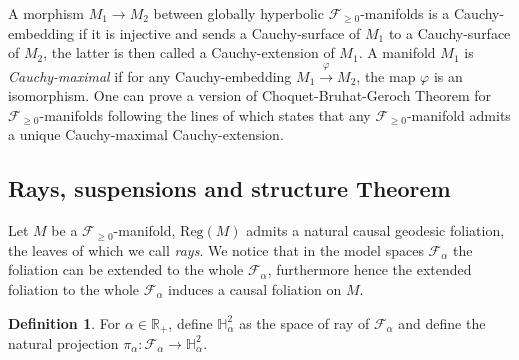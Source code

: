 \documentclass[a4paper,12pt]{article}
\def\H{\mathbb{H}}
\def\RR{\mathbb{R}}
\def\Reg{\mathrm{Reg}}
\def\reg{\Reg}
\def\Future{\mathcal F}
\def\reg{\mathrm{Reg}}
\def\Reg{\mathrm{Reg}}
\theoremstyle{definition}
\newtheorem{defi}[lem]{Definition}	%
\begin{document}
			A morphism $M_1\rightarrow M_2$ between globally hyperbolic $\Future_{\geq0}$-manifolds is a Cauchy-embedding if it is injective and sends a Cauchy-surface of $M_1$ to a Cauchy-surface of $M_2$, the latter is then called a Cauchy-extension of $M_1$. A manifold $M_1$ is {\it Cauchy-maximal} if for any Cauchy-embedding $M_1\xrightarrow{\varphi}M_2$, the map $\varphi$ is an isomorphism. One can prove \cite{thesis,brunswic2021Cauchy} a version of Choquet-Bruhat-Geroch Theorem for $\Future_{\geq0}$-manifolds following the lines of \cite{sbierski_geroch} which states that any $\Future_{\geq0}$-manifold admits a unique Cauchy-maximal Cauchy-extension.     
		\subsection{Rays, suspensions and structure Theorem}
		
		Let $M$ be a $\Future_{\geq0}$-manifold, $\reg(M)$ admits a natural causal geodesic foliation, the leaves of which we call {\it rays}. We notice that in the model spaces $\Future_\alpha$ the foliation can be extended to the whole $\Future_\alpha$, furthermore hence the extended foliation to the whole $\Future_\alpha$ induces a causal foliation on $M$.
		
		
		
		
		\begin{defi} For $\alpha\in \RR_+$, define $\H^2_\alpha$ as the space of ray of $\Future_\alpha$ and define the natural projection $\pi_\alpha: \Future_\alpha\rightarrow \H^2_\alpha$.
		\end{defi}
\end{document}
